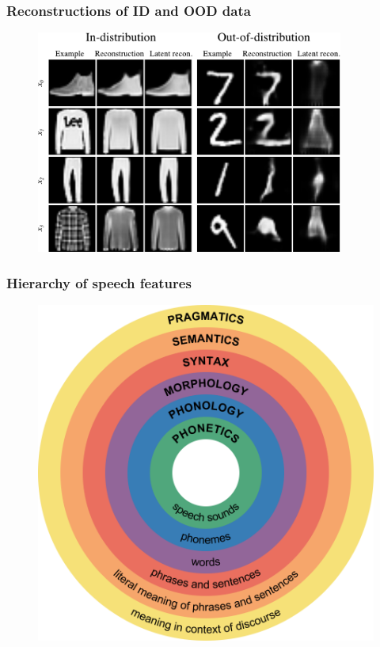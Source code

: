 \begin{frame}
    \frametitle{Reconstructions of ID and OOD data}
    \begin{figure}
        \centering
        \includegraphics[width=0.9\textwidth]{../graphics/paper_hierarchical/reconstructions-front-page-4-samples-2-recons2.pdf}
    \end{figure}
\end{frame}


\begin{frame}
    \frametitle{Hierarchy of speech features}
    \begin{figure}
        \centering
        \includegraphics[height=\textheight]{figures/Major_levels_of_linguistic_structure.png}
    \end{figure}
\end{frame}


